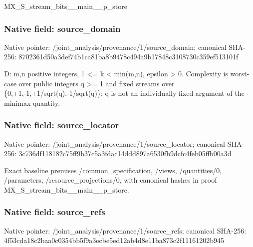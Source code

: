 \documentclass[10pt,a4paper]{article}
\begin{document}
\begingroup\raggedright\sloppy MX\_\allowbreak{}S\_\allowbreak{}stream\_\allowbreak{}bits\_\allowbreak{}\_\allowbreak{}main\_\allowbreak{}\_\allowbreak{}p\_\allowbreak{}store\par\endgroup

\subsubsection{Native field: source\_\allowbreak{}domain}
Native pointer: /joint\_\allowbreak{}analysis/provenance/1/source\_\allowbreak{}domain; canonical SHA-256: 8702361d50a3def74b1ca81ba8b9478c494a9b17848c3108730c359ef513101f

\begingroup\raggedright\sloppy D:\allowbreak{} m,\allowbreak{}n positive integers,\allowbreak{} 1 <=\allowbreak{} k < min(m,\allowbreak{}n),\allowbreak{} epsilon > 0. Complexity is worst-case over public integers q >=\allowbreak{} 1 and fixed streams over \{0,\allowbreak{}+1,\allowbreak{}-1,\allowbreak{}+1/\allowbreak{}sqrt(q),\allowbreak{}-1/\allowbreak{}sqrt(q)\};\allowbreak{} q is not an individually fixed argument of the minimax quantity.\par\endgroup

\subsubsection{Native field: source\_\allowbreak{}locator}
Native pointer: /joint\_\allowbreak{}analysis/provenance/1/source\_\allowbreak{}locator; canonical SHA-256: 3c736df118182c75ff9b37c5a3fdac14ddd897a6530fb9dcfc4feb05ffb00a3d

\begingroup\raggedright\sloppy Exact baseline premises /\allowbreak{}common\_\allowbreak{}specification,\allowbreak{} /\allowbreak{}views,\allowbreak{} /\allowbreak{}quantities/\allowbreak{}0,\allowbreak{} /\allowbreak{}parameters,\allowbreak{} /\allowbreak{}resource\_\allowbreak{}projections/\allowbreak{}0,\allowbreak{} with canonical hashes in proof MX\_\allowbreak{}S\_\allowbreak{}stream\_\allowbreak{}bits\_\allowbreak{}\_\allowbreak{}main\_\allowbreak{}\_\allowbreak{}p\_\allowbreak{}store.\par\endgroup

\subsubsection{Native field: source\_\allowbreak{}refs}
Native pointer: /joint\_\allowbreak{}analysis/provenance/1/source\_\allowbreak{}refs; canonical SHA-256: 4f53cda18c2baa0c0354bb5f9a3ecbe5ed12ab4d8e11ba873c2f11161202b945
\end{document}
